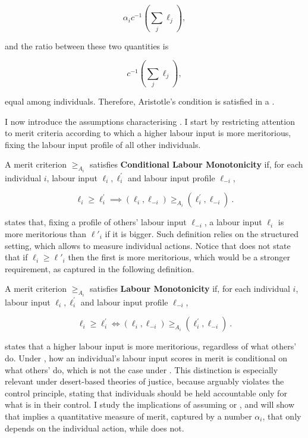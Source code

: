 \[ \alpha_i c^{-1}\left(\sum_{j} \ell_j\right) , \]

and the ratio between these two quantities is

\[ c^{-1}\left(\sum_{j} \ell_j\right) , \]

equal among individuals. Therefore, Aristotle's condition is satisfied in a .

I now introduce the assumptions characterising . I start by restricting attention to merit criteria according to which a higher labour input is more meritorious, fixing the labour input profile of all other individuals.

\begin{definition}\label{def:mono}
	A merit criterion \( \geq_{A_i} \) satisfies \textbf{Conditional Labour Monotonicity} if, for each individual \( i \), labour input \( \ell_i, \ell^{\prime}_{i} \) and labour input profile \( \ell_{-i} \),

	\[ \ell_i \geq \ell_i^{\prime} \implies ( \ell_i, \ell_{-i} ) \geq_{A_i} ( \ell^{\prime}_i, \ell_{-i} ) \: .\]
\end{definition}

 states that, fixing a profile of others' labour input \( \ell_{-i} \), a labour input \( \ell_i \) is more meritorious than \( \ell'_i \) if it is bigger. Such definition relies on the structured setting, which allows to measure individual actions. Notice that  does not state that if \( \ell_i \geq \ell'_i \) then the first is more meritorious, which would be a stronger requirement, as captured in the following definition.

\begin{definition}\label{def:mono'}
	A merit criterion \( \geq_{A_i} \) satisfies \textbf{Labour Monotonicity} if, for each individual \( i \), labour input \( \ell_i, \ell^{\prime}_{i} \) and labour input profile \( \ell_{-i} \),

	\[ \ell_i \geq \ell_i^{\prime} \iff ( \ell_i, \ell_{-i} ) \geq_{A_i} ( \ell^{\prime}_i, \ell_{-i} ) \: .\]
\end{definition}

 states that a higher labour input is more meritorious, regardless of what others' do. Under , how an individual's labour input scores in merit is conditional on what others' do, which is not the case under . This distinction is especially relevant under desert-based theories of justice, because  arguably violates the control principle, stating that individuals should be held accountable only for what is in their control. I study the implications of assuming  or , and will show that  implies a quantitative measure of merit, captured by a number \( \alpha_i \), that only depends on the individual action, while  does not.


